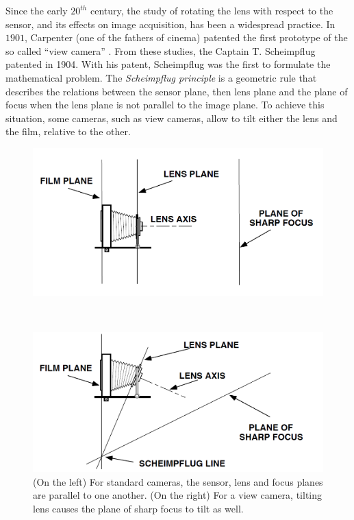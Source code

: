 Since the early $20^{th}$ century, the study of rotating the lens with respect to the sensor, and its effects on image acquisition, has been a widespread practice. In $1901$, Carpenter (one of the fathers of cinema) patented the first prototype of the so called ``view camera'' \cite{pat:carpentier}. From these studies, the Captain T. Scheimpflug patented \cite{pat:scheimpflug} in 1904. With his patent, Scheimpflug was the first to formulate the mathematical problem. The \textit{Scheimpflug principle} is a geometric rule that describes the relations between the sensor plane, then lens plane and the plane of focus when the lens plane is not parallel to the image plane. To achieve this situation, some cameras, such as view cameras, allow to tilt either the lens and the film, relative to the other. \\
  \begin{figure}[b!]
    \centering
    \begin{minipage}[c]{0.49\textwidth}
      \centering
      \includegraphics[width=\textwidth]{./images/tech/sch_par.png}
    \end{minipage}
    \hfill\
    \begin{minipage}[c]{0.49\textwidth}
      \centering
      \includegraphics[width=\textwidth]{./images/tech/sch_tilt.png}
    \end{minipage}
    \caption{(On the left) For standard cameras, the sensor, lens and focus planes are parallel to one another. (On the right) For a view camera, tilting lens causes the plane of sharp focus to tilt as well.}
    \label{fig:scheimpflug}
  \end{figure}

